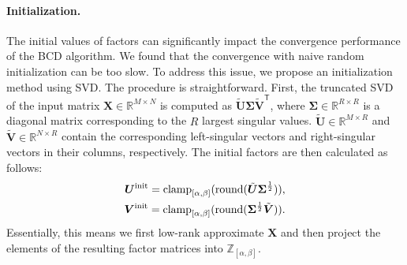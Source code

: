 


\paragraph{Initialization.}
The initial values of factors can significantly impact the convergence performance of the BCD algorithm. We found that the convergence with naive random initialization can be too slow. To address this issue, we propose an initialization method using SVD. The procedure is straightforward. First, the truncated SVD of the input matrix $\bm{X} \in \mathbb{R}^{M \times N}$ is computed as $\tilde{\bm{U}} \bm{\Sigma} \tilde{\bm{V}}^\mathsf{T}$, where $\bm{\Sigma} \in \mathbb{R}^{R \times R}$ is a diagonal matrix corresponding to the $R$ largest singular values. $\tilde{\bm{U}} \in \mathbb{R}^{M \times R}$ and $\tilde{\bm{V}} \in \mathbb{R}^{N \times R}$ contain the corresponding left-singular vectors and right-singular vectors in their columns, respectively. The initial factors are then calculated as follows:
\begin{align} 
	\bm{U}^{\rm init} = \operatorname{clamp}_{[\alpha,\beta]}(\operatorname{round}(\tilde{\bm{U}} \bm{\Sigma}^\frac{1}{2})), \label{eq: initialization: u} \\
	\bm{V}^{\rm init} = \operatorname{clamp}_{[\alpha,\beta]}(\operatorname{round}(\bm{\Sigma}^\frac{1}{2} \tilde{\bm{V}})). \label{eq: initialization: v}
\end{align}
Essentially, this means we first low-rank approximate $\bm{X}$ and then project the elements of the resulting factor matrices into $\mathbb{Z}_{[\alpha,\beta]}$. 

